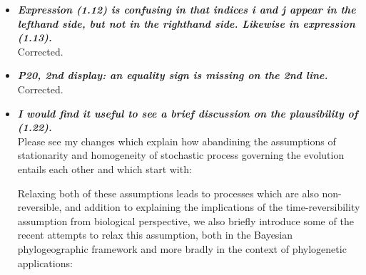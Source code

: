 \documentclass[english]{article}
\begin{document}
\begin{itemize}
\item {
{\it
\textbf{
Expression (1.12) is confusing in that indices i and j appear in the lefthand side, but not in the righthand side. 
Likewise in expression (1.13).
}%
}%
}%
\\
Corrected.



\item {
{\it
\textbf{
P20, 2nd display: an equality sign is missing on the 2nd line.
}%
}%
}%
\\
Corrected.

\item {
{\it
\textbf{
I would find it useful to see a brief discussion on the plausibility of (1.22).
}%
}%
}%
\\
Please see my changes which explain how abandining the assumptions of stationarity and homogeneity of stochastic process governing the evolution entails each other and which start with:

\begin{quote}
\myeditsvsixone
\end{quote}

Relaxing both of these assumptions leads to processes which are also non-reversible, and addition to explaining the implications of the time-reversibility assumption from biological perspective, we also briefly introduce some of the recent attempts to relax this assumption, both in the Bayesian phylogeographic framework and more bradly in the context of phylogenetic applications:

\begin{quote}
\myeditsvsixtwo
\end{quote}




\end{itemize}
\end{document}
